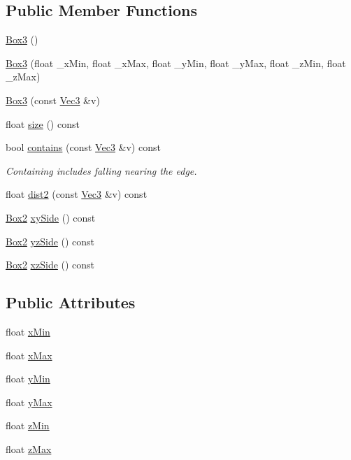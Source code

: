 \subsection*{Public Member Functions}
\begin{DoxyCompactItemize}
\item 
\hyperlink{structBox3_a01c66e99dab9c1316365b51f57b1bdb6}{Box3} ()
\item 
\hyperlink{structBox3_af368463aef860568bfe9592838d36571}{Box3} (float \+\_\+x\+Min, float \+\_\+x\+Max, float \+\_\+y\+Min, float \+\_\+y\+Max, float \+\_\+z\+Min, float \+\_\+z\+Max)
\item 
\hyperlink{structBox3_a4a326b1695b4dc2488cbb41a428ad8c1}{Box3} (const \hyperlink{vec_8h_ae4fcaa7c0a3935930ed1be5f70b90373}{Vec3} \&v)
\item 
float \hyperlink{structBox3_aa78365c1573abce91e6584addcbc686e}{size} () const 
\item 
bool \hyperlink{structBox3_a45cc24b44a662f9e7fee59437acb488b}{contains} (const \hyperlink{vec_8h_ae4fcaa7c0a3935930ed1be5f70b90373}{Vec3} \&v) const 
\begin{DoxyCompactList}\small\item\em Containing includes falling nearing the edge. \end{DoxyCompactList}\item 
float \hyperlink{structBox3_a6c532954804f0b0ed01e6d827e31c7fa}{dist2} (const \hyperlink{vec_8h_ae4fcaa7c0a3935930ed1be5f70b90373}{Vec3} \&v) const 
\item 
\hyperlink{structBox2}{Box2} \hyperlink{structBox3_a3128c9433bac12944ade0674d2fcb899}{xy\+Side} () const 
\item 
\hyperlink{structBox2}{Box2} \hyperlink{structBox3_abfa503aa2f17ec7bffa5a0780aed7b52}{yz\+Side} () const 
\item 
\hyperlink{structBox2}{Box2} \hyperlink{structBox3_a17b0e4e98b259d3a262cb2b9e870df42}{xz\+Side} () const 
\end{DoxyCompactItemize}
\subsection*{Public Attributes}
\begin{DoxyCompactItemize}
\item 
float \hyperlink{structBox3_a57cfa92667f7a90de818969c45e97202}{x\+Min}
\item 
float \hyperlink{structBox3_a4286239d52f1b4092a93269c3082d337}{x\+Max}
\item 
float \hyperlink{structBox3_ae8d4e1606538f889c4df868eb55b2c74}{y\+Min}
\item 
float \hyperlink{structBox3_a449f23c540bae6c91f0599124a895147}{y\+Max}
\item 
float \hyperlink{structBox3_a265c3306101d211cf65fb2fb36dbc276}{z\+Min}
\item 
float \hyperlink{structBox3_a4cecfefa0146353bd4e89623176672e1}{z\+Max}
\end{DoxyCompactItemize}


